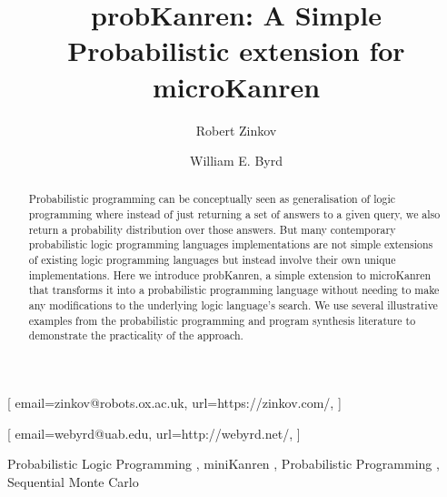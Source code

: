 \documentclass[
]{ceurart}
\begin{document}


\title{probKanren: A Simple Probabilistic extension for microKanren}

\author[1]{Robert Zinkov}[%
email=zinkov@robots.ox.ac.uk,
url=https://zinkov.com/,
]
\address[1]{Dept. of Engineering Science, University of Oxford,
  25 Banbury Rd, Oxford, UK}

\author[2]{William E. Byrd}[%
email=webyrd@uab.edu,
url=http://webyrd.net/,
]
\address[2]{Hugh Kaul Precision Medicine Institute, University of Alabama at Birmingham, 705 20th Street S., Birmingham, AL 35233, United States of America}

\begin{abstract}
  Probabilistic programming can be conceptually seen as generalisation
  of logic programming where instead of just returning a set of
  answers to a given query, we also return a probability distribution
  over those answers. But many contemporary probabilistic logic
  programming languages implementations are not simple extensions of
  existing logic programming languages but instead involve their own
  unique implementations. Here we introduce probKanren, a simple
  extension to microKanren that transforms it into a probabilistic
  programming language without needing to make any modifications to
  the underlying logic language's search. We use several illustrative
  examples from the probabilistic programming and program synthesis
  literature to demonstrate the practicality of the approach.

  
\end{abstract}

\begin{keywords}
  Probabilistic Logic Programming \sep
  miniKanren \sep
  Probabilistic Programming \sep
  Sequential Monte Carlo
\end{keywords}
\end{document}
